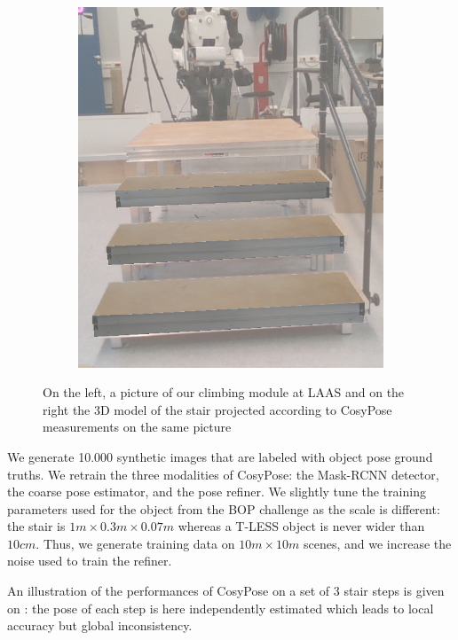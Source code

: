 \begin{figure}[h]
\begin{subfigure}[]{{.33\linewidth}}
        \includegraphics[width=\textwidth]{figures/cosyslam/0006_proj.png} 
    \end{subfigure}
    \caption{On the left, a picture of our climbing module at LAAS and on the right the 3D model of the stair projected according to CosyPose measurements on the same picture}%
    \label{fig:cosypose-ycbv}%
\end{figure}

We generate 10.000 synthetic images that are labeled with object pose ground truths. We retrain the three modalities of CosyPose: 
the Mask-RCNN detector, the coarse pose estimator, and the pose refiner. We slightly tune the training parameters used for the object from the BOP challenge as 
the scale is different: the stair is $1m \times 0.3m \times 0.07m$ whereas a T-LESS object is never wider than $10cm$. 
Thus, we generate training data on $10m \times 10m$ scenes, and we increase the noise used to train the refiner.  

An illustration of the performances of CosyPose on a set of 3 stair steps is given on : 
the pose of each step is here independently estimated which leads to local accuracy but global inconsistency. 



